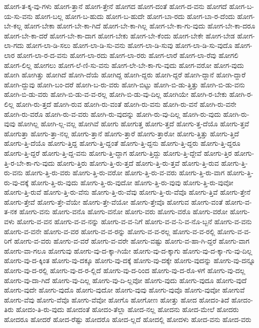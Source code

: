 {ಹೋಗ-ತ-ಕ್ಕ-ವು-ಗಳು
ಹೋಗ-ತ್ತಾನೆ
ಹೋಗ-ತ್ತೇನೆ
ಹೋಗದ
ಹೋಗ-ದಂತೆ
ಹೋಗ-ದ-ವನು
ಹೋಗದೆ
ಹೋಗ-ಬ-ಯ-ಸು-ವನು
ಹೋಗ-ಬಲ್ಲ
ಹೋಗ-ಬ-ಹುದು
ಹೋಗ-ಬ-ಹುದೇ
ಹೋಗ-ಬಾ-ರದು
ಹೋಗ-ಬಾ-ರ-ದೆಂದು
ಹೋಗ-ಬೇ-ಕಲ್ಲ
ಹೋಗ-ಬೇಕಾ
ಹೋಗ-ಬೇ-ಕಾ-ಗಿದೆ
ಹೋಗ-ಬೇ-ಕಾ-ಗಿಲ್ಲ
ಹೋಗ-ಬೇ-ಕಾ-ಗು-ವುದು
ಹೋಗ-ಬೇ-ಕಾ-ದರೂ
ಹೋಗ-ಬೇ-ಕಾ-ದರೆ
ಹೋಗ-ಬೇ-ಕಾ-ದಾಗ
ಹೋಗ-ಬೇಕು
ಹೋಗ-ಬೇ-ಕೆಂದು
ಹೋಗ-ಬೇಕೇ
ಹೋಗ-ಬೇಡ
ಹೋಗ-ಲಾ-ಗದು
ಹೋಗ-ಲಾ-ಡಿ-ಸಲು
ಹೋಗ-ಲಾ-ಡಿ-ಸು-ವನು
ಹೋಗ-ಲಾ-ಡಿ-ಸುವು
ಹೋಗ-ಲಾ-ಡಿ-ಸು-ವುದೊ
ಹೋಗ-ಲಾರ
ಹೋಗ-ಲಾ-ರ-ದ-ವನು
ಹೋಗ-ಲಾ-ರದು
ಹೋಗ-ಲಾ-ರರು
ಹೋಗ-ಲಾರೆ
ಹೋಗ-ಲಾ-ರೆವು
ಹೋಗಲಿ
ಹೋಗ-ಲಿಲ್ಲ
ಹೋಗಲು
ಹೋಗ-ಲೆ-ಣಿ-ಸು-ವನು
ಹೋಗ-ಲೇ-ಬೇ-ಕಾ-ಗು-ವುದು
ಹೋಗ-ವರೋ
ಹೋಗ-ವುದು
ಹೋಗಿ
ಹೋಗಿತ್ತು
ಹೋಗಿದೆ
ಹೋಗಿ-ದೆಯೆ
ಹೋಗಿದ್ದ
ಹೋಗಿ-ದ್ದರು
ಹೋಗಿ-ದ್ದರೆ
ಹೋಗಿ-ದ್ದಾನೆ
ಹೋಗಿ-ದ್ದಾರೆ
ಹೋಗಿ-ದ್ದುವು
ಹೋಗಿ-ಬಂ-ದರೆ
ಹೋಗಿ-ಬ-ರು-ವರು
ಹೋಗಿ-ಬಿಟ್ಟು
ಹೋಗಿ-ಬಿ-ಡು-ತ್ತಿತ್ತು
ಹೋಗಿ-ಬಿ-ಡು-ವನು
ಹೋಗಿ-ಬಿ-ಡು-ವರು
ಹೋಗಿ-ಬಿ-ಡು-ವ-ವ-ರಲ್ಲ
ಹೋಗಿ-ಬಿ-ಡು-ವು-ದಿಲ್ಲ
ಹೋಗಿಯೇ
ಹೋಗಿ-ರ-ಬೇಕು
ಹೋಗಿ-ರ-ಲಿಲ್ಲ
ಹೋಗಿ-ರು-ತ್ತದೆ
ಹೋಗಿ-ರುವ
ಹೋಗಿ-ರು-ವಂತೆ
ಹೋಗಿ-ರು-ವನು
ಹೋಗಿ-ರು-ವನೆ
ಹೋಗಿ-ರು-ವನೇ
ಹೋಗಿ-ರು-ವರೊ
ಹೋಗಿ-ರು-ವ-ವರು
ಹೋಗಿ-ರು-ವುದನ್ನು
ಹೋಗಿ-ರು-ವು-ದಿಲ್ಲ
ಹೋಗಿ-ರು-ವುದು
ಹೋಗಿ-ರು-ವುವು
ಹೋಗಿಲ್ಲ
ಹೋಗಿ-ಲ್ಲ-ವಲ್ಲ
ಹೋಗಿವೆ
ಹೋಗು
ಹೋಗುತ್ತ
ಹೋಗು-ತ್ತದೆ
ಹೋಗು-ತ್ತ-ದೆಯೊ
ಹೋಗು-ತ್ತವೆ
ಹೋಗುತ್ತಾ
ಹೋಗು-ತ್ತಾ-ನಲ್ಲ
ಹೋಗು-ತ್ತಾನೆ
ಹೋಗು-ತ್ತಾರೆ
ಹೋಗು-ತ್ತಾರೋ
ಹೋಗು-ತ್ತಿತ್ತು
ಹೋಗು-ತ್ತಿದೆ
ಹೋಗು-ತ್ತಿ-ದೆಯೊ
ಹೋಗು-ತ್ತಿದ್ದ
ಹೋಗು-ತ್ತಿ-ದ್ದಂತೆ
ಹೋಗು-ತ್ತಿ-ದ್ದನು
ಹೋಗು-ತ್ತಿ-ದ್ದರು
ಹೋಗು-ತ್ತಿ-ದ್ದರೂ
ಹೋಗು-ತ್ತಿ-ದ್ದರೆ
ಹೋಗು-ತ್ತಿ-ದ್ದ-ವನು
ಹೋಗು-ತ್ತಿ-ದ್ದಾಗ
ಹೋಗು-ತ್ತಿದ್ದು
ಹೋಗು-ತ್ತಿ-ದ್ದೇವೆ
ಹೋಗು-ತ್ತಿರ
ಹೋಗು-ತ್ತಿ-ರ-ಬೇ-ಕಾ-ಗು-ವುದು
ಹೋಗು-ತ್ತಿರು
ಹೋಗು-ತ್ತಿ-ರು-ತ್ತದೆ
ಹೋಗು-ತ್ತಿ-ರು-ತ್ತವೆ
ಹೋಗು-ತ್ತಿ-ರುವ
ಹೋಗು-ತ್ತಿ-ರು-ವನು
ಹೋಗು-ತ್ತಿ-ರು-ವರು
ಹೋಗು-ತ್ತಿ-ರು-ವರೋ
ಹೋಗು-ತ್ತಿ-ರು-ವ-ವರು
ಹೋಗು-ತ್ತಿ-ರು-ವಾಗ
ಹೋಗು-ತ್ತಿ-ರು-ವು-ದಕ್ಕೆ
ಹೋಗು-ತ್ತಿ-ರು-ವುದು
ಹೋಗು-ತ್ತಿ-ರು-ವುದೋ
ಹೋಗು-ತ್ತಿ-ರು-ವುವು
ಹೋಗು-ತ್ತಿ-ರು-ವುವೋ
ಹೋಗು-ತ್ತಿ-ರುವೆ
ಹೋಗು-ತ್ತಿ-ರು-ವೆನು
ಹೋಗು-ತ್ತಿ-ರು-ವೆವು
ಹೋಗು-ತ್ತಿ-ರು-ವೆವೊ
ಹೋಗು-ತ್ತಿವೆ
ಹೋಗು-ತ್ತೇನೆ
ಹೋಗು-ತ್ತೇವೆ
ಹೋಗು-ತ್ತೇ-ವೆಯೇ
ಹೋಗು-ತ್ತೇ-ವೆಯೋ
ಹೋಗು-ತ್ತೇವೊ
ಹೋಗುವ
ಹೋಗು-ವಂತೆ
ಹೋಗು-ವ-ತ-ನಕ
ಹೋಗು-ವನು
ಹೋಗು-ವನೊ
ಹೋಗು-ವನೋ
ಹೋಗು-ವರು
ಹೋಗು-ವರೊ
ಹೋಗು-ವರೋ
ಹೋಗು-ವಳು
ಹೋಗು-ವ-ವನ
ಹೋಗು-ವ-ವ-ನನ್ನು
ಹೋಗು-ವ-ವ-ನಿಗೆ
ಹೋಗು-ವ-ವ-ನಿ-ವ-ನೊ-ಬ್ಬನೆ
ಹೋಗು-ವ-ವನು
ಹೋಗು-ವ-ವನೇ
ಹೋಗು-ವ-ವರ
ಹೋಗು-ವ-ವ-ರನ್ನು
ಹೋಗು-ವ-ವ-ರಲ್ಲ
ಹೋಗು-ವ-ವ-ರಲ್ಲಿ
ಹೋಗು-ವ-ವ-ರಿಗೆ
ಹೋಗು-ವ-ವರು
ಹೋಗು-ವ-ವರೆ
ಹೋಗು-ವ-ವರೇ
ಹೋಗು-ವಷ್ಟು
ಹೋಗು-ವ-ಹಾ-ಗಿ-ದ್ದರೆ
ಹೋಗು-ವಾಗ
ಹೋಗು-ವಾ-ಗಲೂ
ಹೋಗುವು
ಹೋಗು-ವು-ದ-ಕ್ಕಾ-ಗಿಯೇ
ಹೋಗು-ವು-ದ-ಕ್ಕಾಗು
ಹೋಗು-ವು-ದ-ಕ್ಕಾ-ಗು-ವು-ದಿಲ್ಲ
ಹೋಗು-ವು-ದ-ಕ್ಕಿಂತ
ಹೋಗು-ವು-ದಕ್ಕೂ
ಹೋಗು-ವು-ದಕ್ಕೆ
ಹೋಗು-ವು-ದಕ್ಕೇ
ಹೋಗು-ವುದನ್ನು
ಹೋಗು-ವು-ದನ್ನೂ
ಹೋಗು-ವು-ದ-ರಲ್ಲಿ
ಹೋಗು-ವು-ದ-ರ-ಲ್ಲಿದೆ
ಹೋಗು-ವು-ದ-ರಿಂದ
ಹೋಗು-ವು-ದ-ರೊ-ಳಗೆ
ಹೋಗು-ವು-ದಲ್ಲ
ಹೋಗು-ವು-ದಾ-ಗಿದೆ
ಹೋಗು-ವು-ದಿಲ್ಲ
ಹೋಗು-ವು-ದಿ-ಲ್ಲವೋ
ಹೋಗು-ವುದು
ಹೋಗು-ವುದೂ
ಹೋಗು-ವುದೆ
ಹೋಗು-ವುದೇ
ಹೋಗು-ವುದೊ
ಹೋಗು-ವುದೋ
ಹೋಗು-ವುವು
ಹೋಗು-ವುವೊ
ಹೋಗು-ವುವೋ
ಹೋಗುವೆ
ಹೋಗು-ವೆವು
ಹೋಗು-ವೆವೊ
ಹೋಗು-ವೆವೋ
ಹೋಗೊ
ಹೋಗೋಣ
ಹೋತ್ತು
ಹೋದ
ಹೋದಂ-ತಿದೆ
ಹೋದಂ-ತಿರು
ಹೋದಂ-ತಿ-ರು-ವುದು
ಹೋದಂತೆ
ಹೋದಂ-ತೆಲ್ಲಾ
ಹೋದ-ನಲ್ಲ
ಹೋದನು
ಹೋದ-ಮೇಲೆ
ಹೋದರು
ಹೋದರೂ
ಹೋದರೆ
ಹೋದ-ರೆಷ್ಟು
ಹೋದರೊ
ಹೋದ-ಲ್ಲದೆ
ಹೋದಲ್ಲಿ
ಹೋದಳು
ಹೋದ-ವನು
ಹೋದ-ವರು
}

